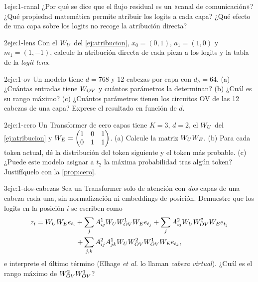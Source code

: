\begin{ejercicio}{1}{eje:1-canal}
¿Por qué se dice que el flujo residual es un «canal de comunicación»? ¿Qué propiedad matemática permite atribuir los logits a cada capa? ¿Qué efecto de una capa sobre los logits no recoge la atribución directa?
\end{ejercicio}

\begin{ejercicio}{2}{eje:1-lens}
Con el $W_{U}$ del \cref{ej:atribucion}, $x_0=(0,1)$, $a_1=(1,0)$ y $m_1=(1,-1)$, calcule la atribución directa de cada pieza a los logits y la tabla de la \emph{logit lens}.
\end{ejercicio}

\begin{ejercicio}{2}{eje:1-ov}
Un modelo tiene $d=768$ y 12 cabezas por capa con $d_h=64$. (a) ¿Cuántas entradas tiene $W_{OV}$ y cuántos parámetros la determinan? (b) ¿Cuál es su rango máximo? (c) ¿Cuántos parámetros tienen los circuitos OV de las 12 cabezas de una capa? Exprese el resultado en función de $d$.
\end{ejercicio}

\begin{ejercicio}{2}{eje:1-cero}
Un Transformer de cero capas tiene $K=3$, $d=2$, el $W_{U}$ del \cref{ej:atribucion} y $W_{E}=\begin{pmatrix}1&0&1\\0&1&1\end{pmatrix}$. (a) Calcule la matriz $W_{U}W_{E}$. (b) Para cada token actual, dé la distribución del token siguiente y el token más probable. (c) ¿Puede este modelo asignar a $t_2$ la máxima probabilidad tras algún token? Justifíquelo con la \cref{prop:cero}.
\end{ejercicio}

\begin{ejercicio}{3}{eje:1-dos-cabezas}
Sea un Transformer solo de atención con \emph{dos} capas de una cabeza cada una, sin normalización ni embeddings de posición. Demuestre que los logits en la posición $i$ se escriben como
\begin{multline*}
z_i=W_{U}W_{E} e_{t_i}+\sum_{j}A^{1}_{ij}W_{U}W_{OV}^{1}W_{E} e_{t_j}+\sum_{j}A^{2}_{ij}W_{U}W_{OV}^{2}W_{E} e_{t_j}\\
+\sum_{j,k}A^{2}_{ij}A^{1}_{jk}W_{U}W_{OV}^{2}W_{OV}^{1}W_{E} e_{t_k},
\end{multline*}
e interprete el último término (Elhage \emph{et al.} lo llaman \emph{cabeza virtual}). ¿Cuál es el rango máximo de $W_{OV}^{2}W_{OV}^{1}$?
\end{ejercicio}

